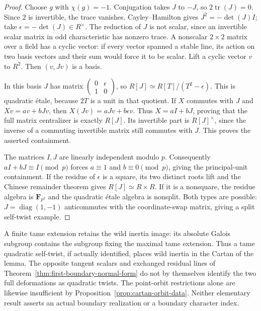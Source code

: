 \begin{proof}
Choose $g$ with $\chi(g)=-1$. Conjugation takes $J$ to $-J$,
so $2\operatorname{tr}(J)=0$. Since $2$ is invertible, the trace
vanishes. Cayley--Hamilton gives
$J^2=-\det(J)I$; take $\epsilon=-\det(J)\in R^\times$.
The reduction of $J$ is not scalar, since an invertible scalar
matrix in odd characteristic has nonzero trace. A nonscalar
$2\times2$ matrix over a field has a cyclic vector: if every
vector spanned a stable line, its action on two basis vectors
and their sum would force it to be scalar. Lift a cyclic vector
$v$ to $R^2$. Then $(v,Jv)$ is a basis.

In this basis $J$ has matrix
$\left(\begin{smallmatrix}0&\epsilon\\1&0\end{smallmatrix}\right)$,
so $R[J]\simeq R[T]/(T^2-\epsilon)$. This is quadratic \'etale,
because $2T$ is a unit in that quotient. If $X$ commutes with $J$
and $Xv=av+bJv$, then $X(Jv)=aJv+b\epsilon v$. Thus
$X=aI+bJ$, proving that the full matrix centralizer is exactly
$R[J]$. Its invertible part is $R[J]^\times$, since the inverse
of a commuting invertible matrix still commutes with $J$.
This proves the asserted containment.

The matrices $I,J$ are linearly independent modulo $p$.
Consequently $aI+bJ\equiv I\pmod p$ forces
$a\equiv1$ and $b\equiv0\pmod p$, giving the principal-unit
containment. If the residue of $\epsilon$ is a square, its two
distinct roots lift and the Chinese remainder theorem gives
$R[J]\simeq R\times R$. If it is a nonsquare, the residue algebra
is $\mathbf F_{p^2}$ and the quadratic \'etale algebra is nonsplit.
Both types are possible: $J=\operatorname{diag}(1,-1)$
anticommutes with the coordinate-swap matrix, giving a split
self-twist example.
\end{proof}

A finite tame extension retains the wild inertia image: its
absolute Galois subgroup contains the subgroup fixing the maximal
tame extension. Thus a tame quadratic self-twist, if actually
identified, places wild inertia in the Cartan of the lemma.
The opposite tangent scalars and exchanged residual lines of
Theorem~\ref{thm:first-boundary-normal-form} do not by themselves
identify the two full deformations as quadratic twists. The
point-orbit restrictions alone are likewise insufficient by
Proposition~\ref{prop:cartan-orbit-data}. Neither elementary result
asserts an actual boundary realization or a boundary character
index.
